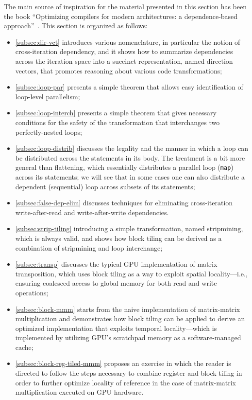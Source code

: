 \documentclass[acmsmall,review]{acmart}\settopmatter{printfolios=true,printccs=false,printacmref=false}
\begin{document}
The main source of inspiration for the material presented in this 
section has been the book 
``Optimizing compilers for modern architectures: a dependence-based approach''~\cite{kennedy2001optimizing}. 
This section is organized as follows:
\begin{itemize}
    \item \cref{subsec:dir-vct} introduces various nomenclature,
        in particular the notion of cross-iteration dependency, and 
        it shows how to summarize dependencies across the iteration 
        space into a succinct representation, named direction vectors, 
        that promotes reasoning about various code transformations;
    \item \cref{subsec:loop-par} presents a simple theorem
        that allows easy identification of loop-level parallelism;
    \item \cref{subsec:loop-interch} presents a simple
        theorem that gives necessary conditions for the safety 
        of the transformation that interchanges two perfectly-nested
        loops;
    \item \cref{subsec:loop-distrib} discusses the legality and
        the manner in which a loop can be distributed across the 
        statements in its body. The treatment is a bit more general
        than flattening, which essentially distributes a parallel loop
        (\lstinline{map}) across its statements; we will see that in 
        some cases one can also distribute a dependent (sequential) 
        loop across subsets of its statements;
    \item \cref{subsec:false-dep-elim} discusses techniques for 
        eliminating cross-iteration write-after-read and 
        write-after-write dependencies.
    \item \cref{subsec:strip-tiling} introducing a simple
        transformation, named stripmining, which is always valid,
        and shows how block tiling can be derived as a combination
        of stripmining and loop interchange;
    \item \cref{subsec:transp} discusses the typical GPU 
        implementation of matrix transposition, which uses block
        tiling as a way to exploit spatial locality---i.e., 
        ensuring coalesced access to global memory for both read
        and write operations;
    \item \cref{subsec:block-mmm} starts from the naive implementation 
        of matrix-matrix multiplication and demonstrates how block tiling 
        can be applied to derive an optimized implementation that
        exploits temporal locality---which is implemented by utilizing
        GPU's scratchpad memory as a software-managed cache;
    \item \cref{subsec:block-reg-tiled-mmm} proposes an exercise in
        which the reader is directed to follow the steps necessary
        to combine register and block tiling in order to further optimize
        locality of reference in the case of matrix-matrix multiplication
        executed on GPU hardware.
\end{itemize}
\end{document}
